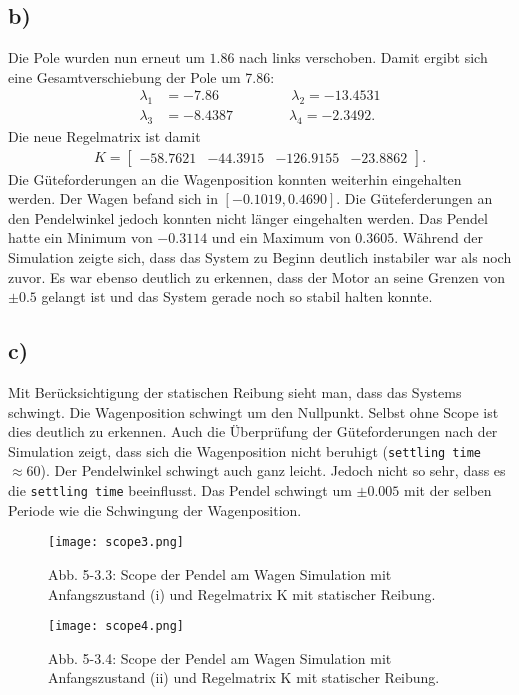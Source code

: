 \documentclass[11pt]{scrartcl} %
\begin{document}
\subsection*{b)}
Die Pole wurden nun erneut um $1.86$ nach links verschoben. Damit ergibt sich eine Gesamtverschiebung der Pole um 7.86:
\begin{align*}
\lambda_1 &= -7.86 \quad\quad\quad\quad\quad\hspace{2pt} \lambda_2 =  -13.4531\\
\lambda_3 &= -8.4387 \quad\quad\quad\quad \lambda_4 = -2.3492.
\end{align*}
Die neue Regelmatrix ist damit
\begin{align*}
K=\begin{bmatrix}
-58.7621 & -44.3915 & -126.9155 & -23.8862
\end{bmatrix}.
\end{align*}
Die Güteforderungen an die Wagenposition konnten weiterhin eingehalten werden. Der Wagen befand sich in $\left[ -0.1019, 0.4690 \right]$. Die Güteferderungen an den Pendelwinkel jedoch konnten nicht länger eingehalten werden. Das Pendel hatte ein Minimum von $-0.3114$ und ein Maximum von $0.3605$. Während der Simulation zeigte sich, dass das System zu Beginn deutlich instabiler war als noch zuvor. Es war ebenso deutlich zu erkennen, dass der Motor an seine Grenzen von $\pm 0.5$ gelangt ist und das System gerade noch so stabil halten konnte.

\subsection*{c)}
Mit Berücksichtigung der statischen Reibung sieht man, dass das Systems schwingt. Die Wagenposition schwingt um den Nullpunkt. Selbst ohne Scope ist dies deutlich zu erkennen. Auch die Überprüfung der Güteforderungen nach der Simulation zeigt, dass sich die Wagenposition nicht beruhigt (\verb+settling time+ $\approx 60$). Der Pendelwinkel schwingt auch ganz leicht. Jedoch nicht so sehr, dass es die \verb+settling time+ beeinflusst. Das Pendel schwingt um $\pm 0.005$ mit der selben Periode wie die Schwingung der Wagenposition.

\begin{figure}[H]
	\centering
	\texttt{[image: scope3.png]}
	\captionsetup{labelformat=empty}
	\caption{\small{Abb. 5-3.3: Scope der Pendel am Wagen Simulation mit Anfangszustand (i) und Regelmatrix K mit statischer Reibung.}}
\end{figure}

\begin{figure}[H]
	\centering
	\texttt{[image: scope4.png]}
	\captionsetup{labelformat=empty}
	\caption{\small{Abb. 5-3.4: Scope der Pendel am Wagen Simulation mit Anfangszustand (ii) und Regelmatrix K mit statischer Reibung.}}
\end{figure}
\end{document}

